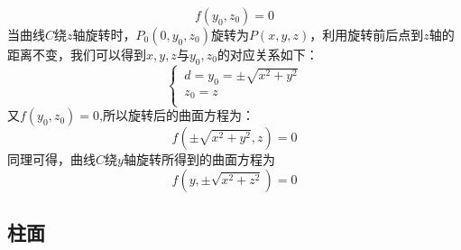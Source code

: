 \begin{equation}
	f(y_0,z_0)=0
\end{equation}
\noindent 当曲线$C$绕$z$轴旋转时，$P_0(0,y_0,z_0)$旋转为$P(x,y,z)$，利用旋转前后点到$z$轴的距离不变，我们可以得到$x,y,z$与$y_0,z_0$的对应关系如下：
\begin{equation}
	\begin{cases}
	\,  d=y_0=\pm\sqrt{x^2+y^2}\\
	\, z_0=z\\
	\end{cases}
\end{equation}
又$f(y_0,z_0)=0$,所以旋转后的曲面方程为：
\begin{equation}
	f(\pm\sqrt{x^2+y^2},z)=0
\end{equation}
同理可得，曲线$C$绕$y$轴旋转所得到的曲面方程为
\begin{equation}
	f(y,\pm \sqrt{x^2+z^2})=0
\end{equation}


\subsection{柱面}
\vspace*{-0.5em}

